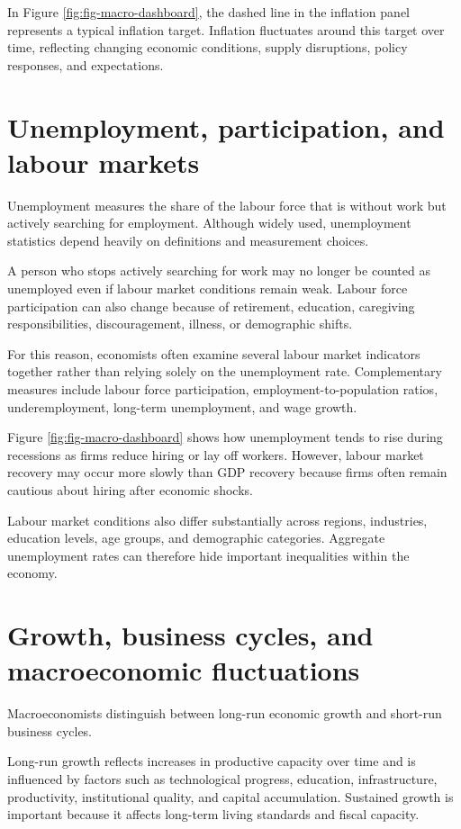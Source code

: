 \documentclass[
  11pt,
  oneside]{book}
\begin{document}
In Figure \ref{fig:fig-macro-dashboard}, the dashed line in the inflation panel represents a typical inflation target. Inflation fluctuates around this target over time, reflecting changing economic conditions, supply disruptions, policy responses, and expectations.

\section{Unemployment, participation, and labour markets}\label{unemployment-participation-and-labour-markets}

Unemployment measures the share of the labour force that is without work but actively searching for employment. Although widely used, unemployment statistics depend heavily on definitions and measurement choices.

A person who stops actively searching for work may no longer be counted as unemployed even if labour market conditions remain weak. Labour force participation can also change because of retirement, education, caregiving responsibilities, discouragement, illness, or demographic shifts.

For this reason, economists often examine several labour market indicators together rather than relying solely on the unemployment rate. Complementary measures include labour force participation, employment-to-population ratios, underemployment, long-term unemployment, and wage growth.

Figure \ref{fig:fig-macro-dashboard} shows how unemployment tends to rise during recessions as firms reduce hiring or lay off workers. However, labour market recovery may occur more slowly than GDP recovery because firms often remain cautious about hiring after economic shocks.

Labour market conditions also differ substantially across regions, industries, education levels, age groups, and demographic categories. Aggregate unemployment rates can therefore hide important inequalities within the economy.

\section{Growth, business cycles, and macroeconomic fluctuations}\label{growth-business-cycles-and-macroeconomic-fluctuations}

Macroeconomists distinguish between long-run economic growth and short-run business cycles.

Long-run growth reflects increases in productive capacity over time and is influenced by factors such as technological progress, education, infrastructure, productivity, institutional quality, and capital accumulation. Sustained growth is important because it affects long-term living standards and fiscal capacity.
\end{document}

